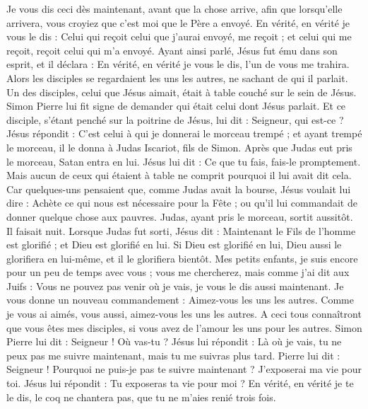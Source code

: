 \begin{multicols}{2}
Je vous dis ceci dès maintenant, avant que la chose arrive, afin que lorsqu'elle arrivera, vous croyiez que c'est moi que le Père a envoyé.
En vérité, en vérité je vous le dis : Celui qui reçoit celui que j'aurai envoyé, me reçoit ; et celui qui me reçoit, reçoit celui qui m'a envoyé.
Ayant ainsi parlé, Jésus fut ému dans son esprit, et il déclara : En vérité, en vérité je vous le dis, l'un de vous me trahira.
Alors les disciples se regardaient les uns les autres, ne sachant de qui il parlait.
Un des disciples, celui que Jésus aimait, était à table couché sur le sein de Jésus.
Simon Pierre lui fit signe de demander qui était celui dont Jésus parlait.
Et ce disciple, s'étant penché sur la poitrine de Jésus, lui dit : Seigneur, qui est-ce ?
Jésus répondit : C'est celui à qui je donnerai le morceau trempé ; et ayant trempé le morceau, il le donna à Judas Iscariot, fils de Simon.
Après que Judas eut pris le morceau, Satan entra en lui. Jésus lui dit : Ce que tu fais, fais-le promptement.
Mais aucun de ceux qui étaient à table ne comprit pourquoi il lui avait dit cela.
Car quelques-uns pensaient que, comme Judas avait la bourse, Jésus voulait lui dire : Achète ce qui nous est nécessaire pour la Fête ; ou qu'il lui commandait de donner quelque chose aux pauvres.
Judas, ayant pris le morceau, sortit aussitôt. Il faisait nuit.
Lorsque Judas fut sorti, Jésus dit : Maintenant le Fils de l'homme est glorifié ; et Dieu est glorifié en lui.
Si Dieu est glorifié en lui, Dieu aussi le glorifiera en lui-même, et il le glorifiera bientôt.
Mes petits enfants, je suis encore pour un peu de temps avec vous ; vous me chercherez, mais comme j'ai dit aux Juifs : Vous ne pouvez pas venir où je vais, je vous le dis aussi maintenant.
Je vous donne un nouveau commandement : Aimez-vous les uns les autres. Comme je vous ai aimés, vous aussi, aimez-vous les uns les autres.
A ceci tous connaîtront que vous êtes mes disciples, si vous avez de l'amour les uns pour les autres.
Simon Pierre lui dit : Seigneur ! Où vas-tu ? Jésus lui répondit : Là où je vais, tu ne peux pas me suivre maintenant, mais tu me suivras plus tard.
Pierre lui dit : Seigneur ! Pourquoi ne puis-je pas te suivre maintenant ? J'exposerai ma vie pour toi.
Jésus lui répondit : Tu exposeras ta vie pour moi ? En vérité, en vérité je te le dis, le coq ne chantera pas, que tu ne m'aies renié trois fois.

\end{multicols}
